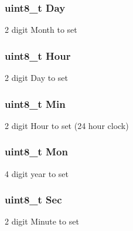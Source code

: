 \subsubsection[{Day}]{\setlength{\rightskip}{0pt plus 5cm}uint8\+\_\+t Day}\label{struct___r_t_c_struct__s_a685ae534ac9b397ce1b7e312cd180568}
2 digit Month to set \hypertarget{struct___r_t_c_struct__s_a000e4faf8c0a1d07d99fe67f7f56be57}{}
\subsubsection[{Hour}]{\setlength{\rightskip}{0pt plus 5cm}uint8\+\_\+t Hour}\label{struct___r_t_c_struct__s_a000e4faf8c0a1d07d99fe67f7f56be57}
2 digit Day to set \hypertarget{struct___r_t_c_struct__s_a46cea0aed4bfe8e09e0220b530eca314}{}
\subsubsection[{Min}]{\setlength{\rightskip}{0pt plus 5cm}uint8\+\_\+t Min}\label{struct___r_t_c_struct__s_a46cea0aed4bfe8e09e0220b530eca314}
2 digit Hour to set (24 hour clock) \hypertarget{struct___r_t_c_struct__s_a6fbaba1425c962fcc411716d7c4dfcbd}{}
\subsubsection[{Mon}]{\setlength{\rightskip}{0pt plus 5cm}uint8\+\_\+t Mon}\label{struct___r_t_c_struct__s_a6fbaba1425c962fcc411716d7c4dfcbd}
4 digit year to set \hypertarget{struct___r_t_c_struct__s_aba0dd5d75a356b633902e4b35e9d9a21}{}
\subsubsection[{Sec}]{\setlength{\rightskip}{0pt plus 5cm}uint8\+\_\+t Sec}\label{struct___r_t_c_struct__s_aba0dd5d75a356b633902e4b35e9d9a21}
2 digit Minute to set \hypertarget{struct___r_t_c_struct__s_aea562614f5f4bba45a661bf5b04fe2bf}{}
